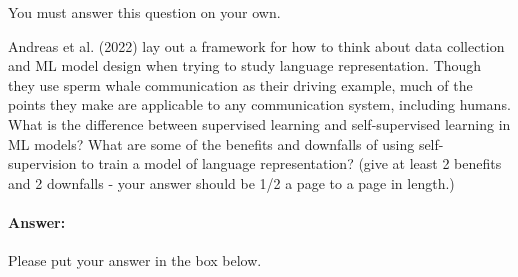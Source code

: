 \documentclass[10pt]{article}
\begin{document}
You must answer this question on your own.

Andreas et al. (2022) lay out a framework for how to think about data collection and ML model design when trying to study language representation. Though they use sperm whale communication as their driving example, much of the points they make are applicable to any communication system, including humans. What is the difference between supervised learning and self-supervised learning in ML models? What are some of the benefits and downfalls of using self-supervision to train a model of language representation? (give at least 2 benefits and 2 downfalls - your answer should be 1/2 a page to a page in length.)


\paragraph{Answer:} Please put your answer in the box below.
\end{document}
